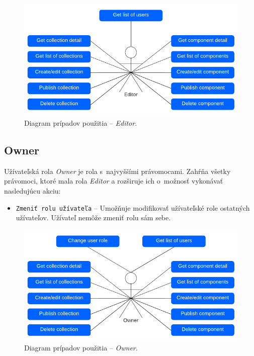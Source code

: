 \begin{figure}[h]
	\centering
	\includegraphics[scale=0.9]{obrazky-figures/editor_use_case}
	\caption{Diagram prípadov použitia -- \emph{Editor}.}
\end{figure}

\subsection{Owner}
Užívateľská rola \emph{Owner} je rola s~najvyššími právomocami. Zahŕňa všetky právomoci, ktoré mala rola \emph{Editor} a rozširuje ich o~možnosť vykonávať nasledujúcu akciu:

\begin{itemize}
	\item \texttt{Zmeniť rolu užívateľa} -- Umožňuje modifikovať užívateľské role ostatných užívateľov. Užívateľ nemôže zmeniť rolu sám sebe. 
\end{itemize}

\begin{figure}[h]
	\centering
	\includegraphics[scale=0.9]{obrazky-figures/owner_use_case}
	\caption{Diagram prípadov použitia -- \emph{Owner}.}
\end{figure}

